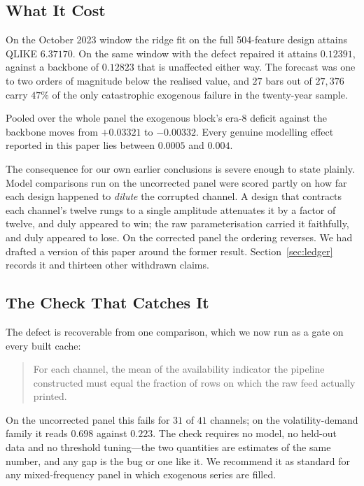 \subsection{What It Cost}

On the October 2023 window the ridge fit on the full 504-feature design
attains QLIKE $6.37170$. On the same window with the defect repaired it attains
$0.12391$, against a backbone of $0.12823$ that is unaffected either way. The
forecast was one to two orders of magnitude below the realised value, and $27$
bars out of $27{,}376$ carry $47\%$ of the only catastrophic exogenous failure
in the twenty-year sample.

Pooled over the whole panel the exogenous block's era-8 deficit against the
backbone moves from $+0.03321$ to $-0.00332$. Every genuine modelling effect
reported in this paper lies between $0.0005$ and $0.004$.

The consequence for our own earlier conclusions is severe enough to state
plainly. Model comparisons run on the uncorrected panel were scored partly on
how far each design happened to \emph{dilute} the corrupted channel. A design
that contracts each channel's twelve rungs to a single amplitude attenuates it
by a factor of twelve, and duly appeared to win; the raw parameterisation
carried it faithfully, and duly appeared to lose. On the corrected panel the
ordering reverses. We had drafted a version of this paper around the former
result. Section~\ref{sec:ledger} records it and thirteen other withdrawn
claims.

\subsection{The Check That Catches It}

The defect is recoverable from one comparison, which we now run as a gate on
every built cache:

\begin{quote}
For each channel, the mean of the availability indicator the pipeline
constructed must equal the fraction of rows on which the raw feed actually
printed.
\end{quote}

On the uncorrected panel this fails for $31$ of $41$ channels; on the
volatility-demand family it reads $0.698$ against $0.223$. The check requires
no model, no held-out data and no threshold tuning---the two quantities are
estimates of the same number, and any gap is the bug or one like it. We
recommend it as standard for any mixed-frequency panel in which exogenous
series are filled.

